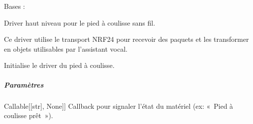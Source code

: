 \documentclass[letterpaper,10pt,french]{sphinxmanual}
\begin{document}
\begin{fulllineitems}
\label{\detokenize{api/hardware.devices:hardware.devices.caliper.CaliperDriver}}
\pysigstartsignatures
\pysiglinewithargsret
{}
{\sphinxparamcomma {}}
{}
\pysigstopsignatures
\sphinxAtStartPar
Bases : 

\sphinxAtStartPar
Driver haut niveau pour le pied à coulisse sans fil.

\sphinxAtStartPar
Ce driver utilise le transport NRF24 pour recevoir des paquets et les
transformer en objets  utilisables par l’assistant vocal.

\begin{fulllineitems}
\label{\detokenize{api/hardware.devices:hardware.devices.caliper.CaliperDriver.__init__}}
\pysigstartsignatures
\pysiglinewithargsret
{}
{\sphinxparamcomma {}}
{}
\pysigstopsignatures
\sphinxAtStartPar
Initialise le driver du pied à coulisse.


\subparagraph{Paramètres}
\label{\detokenize{api/hardware.devices:parametres}}\begin{description}
\sphinxlineitem{on\_status}{[}Callable{[}{[}str{]}, None{]}{]}
\sphinxAtStartPar
Callback pour signaler l’état du matériel (ex: « Pied à coulisse prêt »).


\end{description}
\end{fulllineitems}
\end{fulllineitems}
\end{document}
